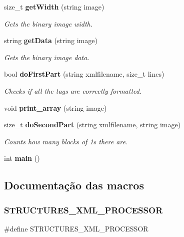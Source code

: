 \begin{DoxyCompactItemize}
size\+\_\+t \textbf{ get\+Width} (string image)
\begin{DoxyCompactList}\small\item\em Gets the binary image width. \end{DoxyCompactList}\item 
string \textbf{ get\+Data} (string image)
\begin{DoxyCompactList}\small\item\em Gets the binary image data. \end{DoxyCompactList}\item 
bool \textbf{ do\+First\+Part} (string xmlfilename, size\+\_\+t lines)
\begin{DoxyCompactList}\small\item\em Checks if all the tags are correctly formatted. \end{DoxyCompactList}\item 
void \textbf{ print\+\_\+array} (string image)
\item 
size\+\_\+t \textbf{ do\+Second\+Part} (string xmlfilename, string image)
\begin{DoxyCompactList}\small\item\em Counts how many blocks of 1\textquotesingle{}s there are. \end{DoxyCompactList}\item 
int \textbf{ main} ()
\end{DoxyCompactItemize}


\subsection{Documentação das macros}
\mbox{\label{_x_m_l__processor__with__binary__images_8cpp_ab4940889fbe16c71ac218ba807587a74}} 
\subsubsection{S\+T\+R\+U\+C\+T\+U\+R\+E\+S\+\_\+\+X\+M\+L\+\_\+\+P\+R\+O\+C\+E\+S\+S\+OR}
{\footnotesize\ttfamily \#define S\+T\+R\+U\+C\+T\+U\+R\+E\+S\+\_\+\+X\+M\+L\+\_\+\+P\+R\+O\+C\+E\+S\+S\+OR}



